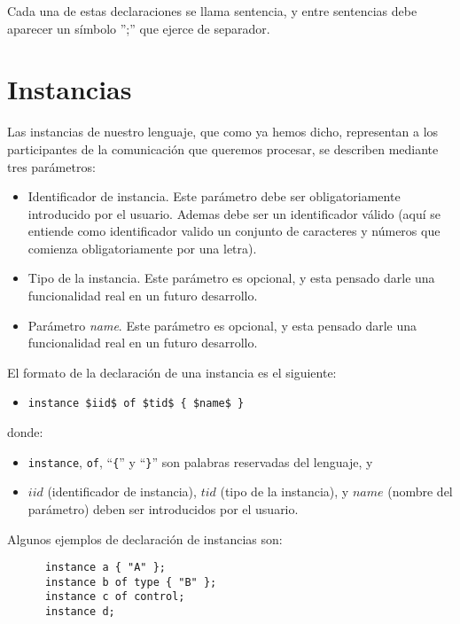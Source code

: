 Cada una de estas declaraciones se llama sentencia, y entre sentencias
debe aparecer un símbolo '';'' que ejerce de separador.

\section{Instancias}\label{sec:Instancias}

Las instancias de nuestro lenguaje, que como ya hemos dicho,
representan a los participantes de la comunicación que queremos
procesar, se describen mediante tres
parámetros:

\begin{itemize}
\item Identificador de instancia. Este parámetro debe ser
  obligatoriamente introducido por el usuario. Ademas debe ser un
  identificador válido (aquí se entiende como identificador valido un
  conjunto de caracteres y números que comienza obligatoriamente por
  una letra).
\item Tipo de la instancia. Este parámetro es opcional, y esta pensado
  darle una funcionalidad real en un futuro desarrollo.
\item Parámetro \textit{name}. Este parámetro es opcional, y esta
  pensado darle una funcionalidad real en un futuro desarrollo.
\end{itemize}

El formato de la declaración de una instancia es el siguiente:

\begin{itemize}
\item \lstinline[mathescape]!instance $iid$ of $tid$ { $name$ }!
\end{itemize}
donde:
\begin{itemize}
\item \lstinline{instance}, \lstinline{of}, ``\lstinline!{!'' y
    ``\lstinline!}!'' son palabras reservadas del lenguaje, y
\item $iid$ (identificador de instancia), $tid$ (tipo de la
  instancia), y $name$ (nombre del parámetro) deben ser introducidos
  por el usuario.
\end{itemize}

Algunos ejemplos de declaración de instancias son:

\begin{lstlisting}
      instance a { "A" };
      instance b of type { "B" };
      instance c of control;
      instance d;
\end{lstlisting}

